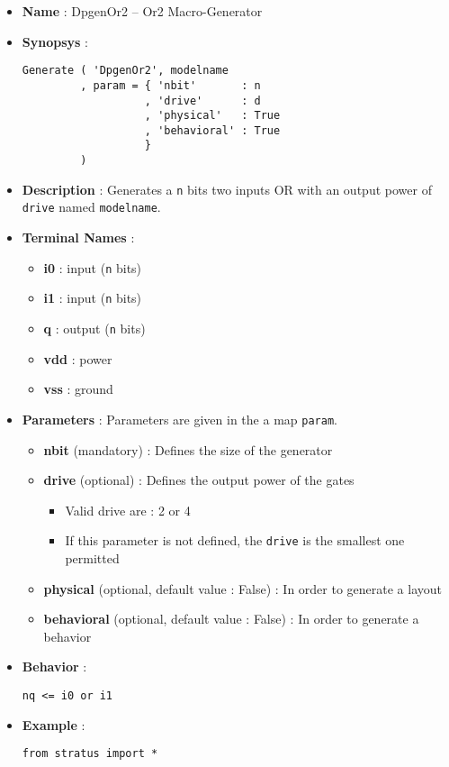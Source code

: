 \begin{itemize}
    \item \textbf{Name} : DpgenOr2 -- Or2 Macro-Generator
    \item \textbf{Synopsys} :
\begin{verbatim}
Generate ( 'DpgenOr2', modelname
         , param = { 'nbit'       : n
                   , 'drive'      : d
                   , 'physical'   : True
                   , 'behavioral' : True                   
                   }
         )
\end{verbatim}
    \item \textbf{Description} : Generates a \verb-n- bits two inputs OR with an output power of \verb-drive- named \verb-modelname-.
    \item \textbf{Terminal Names} :
    \begin{itemize}
        \item \textbf{i0} : input (\verb-n- bits)
        \item \textbf{i1} : input (\verb-n- bits)
        \item \textbf{q} : output (\verb-n- bits)
        \item \textbf{vdd} : power
        \item \textbf{vss} : ground
    \end{itemize}
    \item \textbf{Parameters} : Parameters are given in the a map \verb-param-.
    \begin{itemize}
        \item \textbf{nbit} (mandatory) : Defines the size of the generator
        \item \textbf{drive} (optional) : Defines the output power of the gates
        \begin{itemize}
            \item Valid drive are : 2 or 4
            \item If this parameter is not defined, the \verb-drive- is the smallest one permitted
        \end{itemize}
        \item \textbf{physical} (optional, default value : False) : In order to generate a layout
        \item \textbf{behavioral} (optional, default value : False) : In order to generate a behavior        
    \end{itemize}
    \item \textbf{Behavior} :
\begin{verbatim}
nq <= i0 or i1
\end{verbatim}
    \item \textbf{Example} :
\begin{verbatim}
from stratus import *


\end{verbatim}
\end{itemize}
